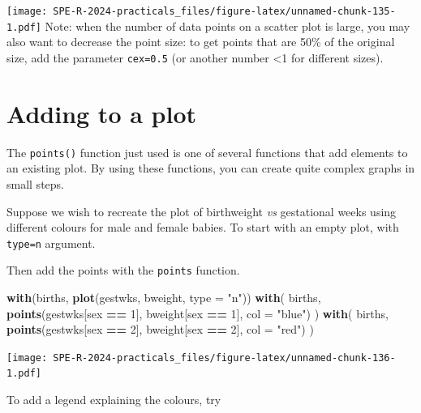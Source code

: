 \documentclass[
]{book}
\newenvironment{Shaded}{\begin{snugshade}}{\end{snugshade}}
\newcommand{\AttributeTok}[1]{\textcolor[rgb]{0.13,0.29,0.53}{#1}}
\newcommand{\DecValTok}[1]{\textcolor[rgb]{0.00,0.00,0.81}{#1}}
\newcommand{\FunctionTok}[1]{\textcolor[rgb]{0.13,0.29,0.53}{\textbf{#1}}}
\newcommand{\NormalTok}[1]{#1}
\newcommand{\SpecialCharTok}[1]{\textcolor[rgb]{0.81,0.36,0.00}{\textbf{#1}}}
\newcommand{\StringTok}[1]{\textcolor[rgb]{0.31,0.60,0.02}{#1}}
\begin{document}
\texttt{[image: SPE-R-2024-practicals\_files/figure-latex/unnamed-chunk-135-1.pdf]}
Note: when the number of data points on a scatter plot is large, you may also want to decrease the point size: to get points that are 50\% of the original size, add the parameter \texttt{cex=0.5} (or another number \textless1 for different sizes).

\section{Adding to a plot}\label{adding-to-a-plot}

The \texttt{points()} function just used is one of several functions
that add elements to an existing plot. By using these functions, you
can create quite complex graphs in small steps.

Suppose we wish to recreate the plot of birthweight \emph{vs} gestational
weeks using different colours for male and female babies. To start with
an empty plot, with \texttt{type=\textquotesingle{}n\textquotesingle{}} argument.

Then add the points with the \texttt{points} function.

\begin{Shaded}
\begin{Highlighting}[]
\FunctionTok{with}\NormalTok{(births, }\FunctionTok{plot}\NormalTok{(gestwks, bweight, }\AttributeTok{type =} \StringTok{"n"}\NormalTok{))}
\FunctionTok{with}\NormalTok{(}
\NormalTok{  births, }
  \FunctionTok{points}\NormalTok{(gestwks[sex }\SpecialCharTok{==} \DecValTok{1}\NormalTok{], bweight[sex }\SpecialCharTok{==} \DecValTok{1}\NormalTok{], }\AttributeTok{col =} \StringTok{"blue"}\NormalTok{)}
\NormalTok{)}
\FunctionTok{with}\NormalTok{(}
\NormalTok{  births, }
  \FunctionTok{points}\NormalTok{(gestwks[sex }\SpecialCharTok{==} \DecValTok{2}\NormalTok{], bweight[sex }\SpecialCharTok{==} \DecValTok{2}\NormalTok{], }\AttributeTok{col =} \StringTok{"red"}\NormalTok{)}
\NormalTok{)}
\end{Highlighting}
\end{Shaded}

\texttt{[image: SPE-R-2024-practicals\_files/figure-latex/unnamed-chunk-136-1.pdf]}

To add a legend explaining the colours, try
\end{document}

